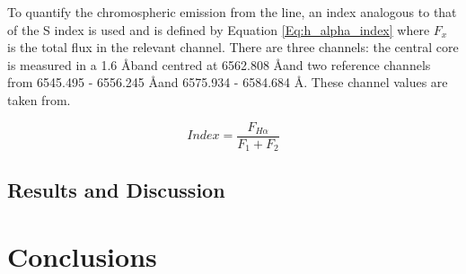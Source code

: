 To quantify the chromospheric emission from the \Halpha line, an index analogous to that of the S index is used and is defined by Equation \ref{Eq:h_alpha_index} where $F_{x}$ is the total flux in the relevant channel. There are three channels: the central \Halpha core is measured in a 1.6 \AA \space band centred at 6562.808 \AA \space and two reference channels from 6545.495 - 6556.245 \AA \space and 6575.934 - 6584.684 \AA. These channel values are taken from.

\begin{equation}
    Index = \frac{F_{H{\alpha}}}{F_{1}+F_{2}}
    \label{Eq:h_alpha_index}
\end{equation}










\subsection{Results and Discussion}







\section{Conclusions}







